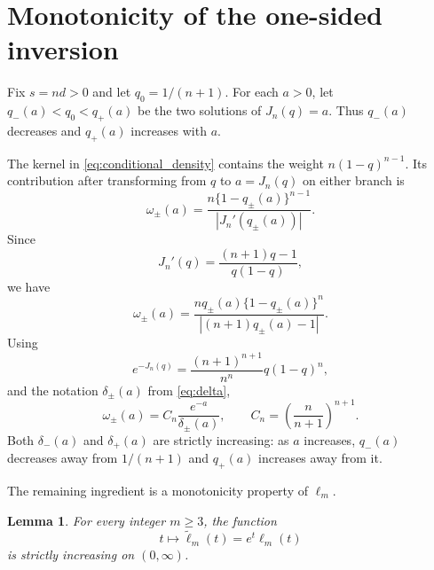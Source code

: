 \documentclass[11pt]{article}
\newtheorem{lemma}[theorem]{Lemma}
\theoremstyle{remark}
\begin{document}
\appendix
\section{Monotonicity of the one-sided inversion}
\label{app:monotonicity}

Fix $s=nd>0$ and let $q_0=1/(n+1)$. For each $a>0$, let $q_-(a)<q_0<q_+(a)$ be the two solutions of $J_n(q)=a$. Thus $q_-(a)$ decreases and $q_+(a)$ increases with $a$.

The kernel in \eqref{eq:conditional_density} contains the weight $n(1-q)^{n-1}$. Its contribution after transforming from $q$ to $a=J_n(q)$ on either branch is
\begin{equation}
 \omega_\pm(a)
 =\frac{n\{1-q_\pm(a)\}^{n-1}}
        {|J_n'(q_\pm(a))|}.
 \label{eq:wbranch}
\end{equation}
Since
\begin{equation}
 J_n'(q)=\frac{(n+1)q-1}{q(1-q)},
 \label{eq:Jprime}
\end{equation}
we have
\begin{equation}
 \omega_\pm(a)
 =\frac{nq_\pm(a)\{1-q_\pm(a)\}^n}
        {|(n+1)q_\pm(a)-1|}.
 \label{eq:wbranch2}
\end{equation}
Using
\begin{equation}
 e^{-J_n(q)}
 =\frac{(n+1)^{n+1}}{n^n}q(1-q)^n,
 \label{eq:e_minus_J}
\end{equation}
and the notation $\delta_\pm(a)$ from \eqref{eq:delta},
\begin{equation}
 \omega_\pm(a)=C_n\frac{e^{-a}}{\delta_\pm(a)},
 \qquad
 C_n=\left(\frac{n}{n+1}\right)^{n+1}.
 \label{eq:wfactor}
\end{equation}
Both $\delta_-(a)$ and $\delta_+(a)$ are strictly increasing: as $a$ increases, $q_-(a)$ decreases away from $1/(n+1)$ and $q_+(a)$ increases away from it.

The remaining ingredient is a monotonicity property of $\ell_m$.

\begin{lemma}
\label{lem:tilted_increasing}
For every integer $m\ge3$, the function
\begin{equation}
 t\longmapsto \widetilde\ell_m(t)=e^t\ell_m(t)
 \label{eq:tilted_ell}
\end{equation}
is strictly increasing on $(0,\infty)$.
\end{lemma}
\end{document}
